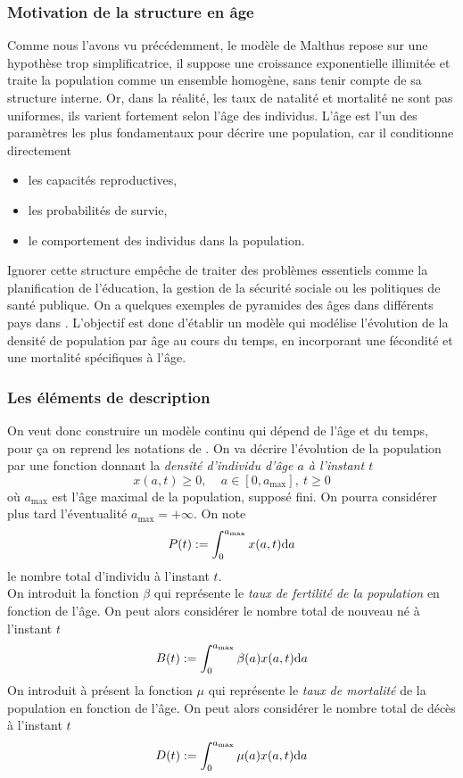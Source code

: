 \subsubsection{Motivation de la structure en âge}
Comme nous l'avons vu précédemment, le modèle de Malthus repose sur une hypothèse trop simplificatrice, il suppose une croissance exponentielle illimitée et traite la population comme un ensemble homogène, sans tenir compte de sa structure interne. Or, dans la réalité, les taux de natalité et mortalité ne sont pas uniformes, ils varient fortement selon l'âge des individus.
L'âge est l'un des paramètres les plus fondamentaux pour décrire une population, car il conditionne directement 
\begin{itemize}
    \item les capacités reproductives,
    \item les probabilités de survie,
    \item le comportement des individus dans la population.
\end{itemize}
Ignorer cette structure empêche de traiter des problèmes essentiels comme la planification de l'éducation, la gestion de la sécurité sociale ou les politiques de santé publique. On a quelques exemples de pyramides des âges dans différents pays dans \cite{Iannelli2017}. L'objectif est donc d'établir un modèle qui modélise l'évolution de la densité de population par âge au cours du temps, en incorporant une fécondité et une mortalité spécifiques à l'âge.

\subsubsection{Les éléments de description} 
On veut donc construire un modèle continu qui dépend de l'âge et du temps, pour ça on reprend les notations de \cite{Iannelli2017}. On va décrire l'évolution de la population par une fonction donnant la \textcolor{astral}{\textit{densité d'individu d'âge $a$ à l'instant $t$}}
\begin{equation*}
    x(a,t) \geq 0, \ \ \ \ \ a \in [0,a_{\max}], \ t \geq 0
\end{equation*}
où $a_{\max}$ est l'âge maximal de la population, supposé fini. On pourra considérer plus tard l'éventualité $a_{\max} = +\infty$. On note 
\begin{equation*}
    P(t) := \int_0^{a_{\max}} x(a,t)\mathrm{d} a
\end{equation*}
le nombre total d'individu à l'instant $t$. 
\\
On introduit la fonction $\beta$ qui représente le \textcolor{astral}{\textit{taux de fertilité de la population}} en fonction de l'âge. On peut alors considérer le nombre total de nouveau né à l'instant $t$
\begin{equation*}
    B(t):= \int_{0}^{a_{\max}}\beta(a)x(a,t)\mathrm{d} a
\end{equation*}
On introduit à présent la fonction $\mu$ qui représente le \textcolor{astral}{\textit{taux de mortalité}} de la population en fonction de l'âge. On peut alors considérer le nombre total de décès à l'instant $t$
\begin{equation*}
    D(t) := \int_{0}^{a_{\max}} \mu(a)x(a,t)\mathrm{d} a
\end{equation*}

